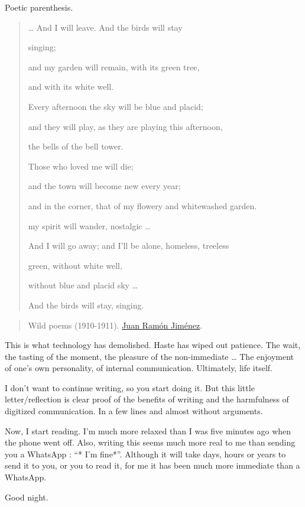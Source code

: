 \documentclass[]{book}
\begin{document}
Poetic parenthesis.

\begin{quote}
\ldots{} And I will leave. And the birds will stay

singing;

and my garden will remain, with its green tree,

and with its white well.

Every afternoon the sky will be blue and placid;

and they will play, as they are playing this afternoon,

the bells of the bell tower.

Those who loved me will die;

and the town will become new every year;

and in the corner, that of my flowery and whitewashed garden.

my spirit will wander, nostalgic \ldots{}

And I will go away; and I'll be alone, homeless, treeless

green, without white well,

without blue and placid sky \ldots{}

And the birds will stay, singing.
\end{quote}

\begin{quote}
Wild poems (1910-1911). \href{https://en.wikipedia.org/wiki/Juan_Ram\%C3\%B3n_Jim\%C3\%A9nez}{Juan Ramón Jiménez}. \citep{jimenez1970tercera}
\end{quote}

This is what technology has demolished. Haste has wiped out patience. The wait, the tasting of the moment, the pleasure of the non-immediate \ldots{} The enjoyment of one's own personality, of internal communication. Ultimately, life itself.

I don't want to continue writing, so you start doing it. But this little letter/reflection is clear proof of the benefits of writing and the harmfulness of digitized communication. In a few lines and almost without arguments.

Now, I start reading. I'm much more relaxed than I was five minutes ago when the phone went off. Also, writing this seems much more real to me than sending you a WhatsApp : ``* I'm fine*''. Although it will take days, hours or years to send it to you, or you to read it, for me it has been much more immediate than a WhatsApp.

Good night.
\end{document}
